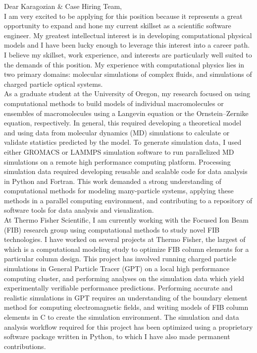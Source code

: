 \documentclass[]{letter}
\begin{document}

Dear Karagozian \& Case Hiring Team, \\

I am very excited to be applying for this position because it represents a great opportunity to expand and hone my current skillset as a scientific software engineer. My greatest intellectual interest is in developing computational physical models and I have been lucky enough to leverage this interest into a career path. I believe my skillset, work experience, and interests are particularly well suited to the demands of this position. My experience with computational physics lies in two primary domains: molecular simulations of complex fluids, and simulations of charged particle optical systems. \\

As a graduate student at the University of Oregon, my research focused on using computational methods to build models of individual macromolecules or ensembles of macromolecules using a Langevin equation or the Ornstein–Zernike equation, respectively. In general, this required developing a theoretical model and using data from molecular dynamics (MD) simulations to calculate or validate statistics predicted by the model. To generate simulation data, I used either GROMACS or LAMMPS simulation software to run parallelized MD simulations on a remote high performance computing platform. Processing simulation data required developing reusable and scalable code for data analysis in Python and Fortran. This work demanded a strong understanding of computational methods for modeling many-particle systems, applying these methods in a parallel computing environment, and contributing to a repository of software tools for data analysis and visualization. \\

At Thermo Fisher Scientific, I am currently working with the Focused Ion Beam (FIB) research group using computational methods to study novel FIB technologies. I have worked on several projects at Thermo Fisher, the largest of which is a computational modeling study to optimize FIB column elements for a particular column design. This project has involved running charged particle simulations in General Particle Tracer (GPT) on a local high performance computing cluster, and performing analyses on the simulation data which yield experimentally verifiable performance predictions. Performing accurate and realistic simulations in GPT requires an understanding of the boundary element method for computing electromagnetic fields, and writing models of FIB column elements in C to create the simulation environment. The simulation and data analysis workflow required for this project has been optimized using a proprietary software package written in Python, to which I have also made permanent contributions. \\
\end{document}

